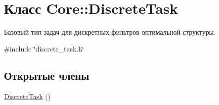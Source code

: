 \hypertarget{class_core_1_1_discrete_task}{}\section{Класс Core\+:\+:Discrete\+Task}
\label{class_core_1_1_discrete_task}


Базовый тип задач для дискретных фильтров оптимальной структуры.  




{\ttfamily \#include \char`\"{}discrete\+\_\+task.\+h\char`\"{}}

\subsection*{Открытые члены}
\begin{DoxyCompactItemize}
\item 
\hyperlink{class_core_1_1_discrete_task_adee71fa5aa876df16d0585bdf66cd26e}{Discrete\+Task} ()\hypertarget{class_core_1_1_discrete_task_adee71fa5aa876df16d0585bdf66cd26e}{}\label{class_core_1_1_discrete_task_adee71fa5aa876df16d0585bdf66cd26e}


\end{DoxyCompactItemize}
